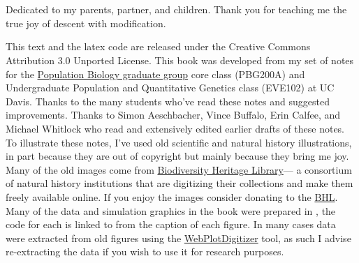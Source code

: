 \documentclass{tufte-book}
\begin{document}
\begin{fullwidth}
~\vfill
\thispagestyle{empty}

~\vfill
\begin{doublespace}
\noindent\fontsize{16}{18}\selectfont\itshape   %
\nohyphenation
\begin{center}
Dedicated to my parents, partner, and children. Thank you for teaching me the
true joy of descent with modification.
\end{center}
\end{doublespace}
\vfill
\vfill

\setlength{\parindent}{0pt}
\setlength{\parskip}{\baselineskip}
  \small This text and the latex code are released under the
  Creative Commons Attribution 3.0 Unported License. This book was developed from my set of notes for the \href{http://www-eve.ucdavis.edu/eve/pbg/}{Population
  Biology graduate group} core class (PBG200A) and Undergraduate Population and
  Quantitative Genetics class (EVE102) at UC Davis. Thanks to the many
  students who've read these notes and suggested improvements. Thanks
 to Simon Aeschbacher, Vince Buffalo, Erin Calfee, and Michael Whitlock who read
 and extensively edited earlier drafts of these notes. To illustrate these notes, I've used old scientific and natural history illustrations, in part
 because they are out of copyright but mainly because they bring me
 joy. Many of the old images come from
 \href{https://www.biodiversitylibrary.org/}{Biodiversity Heritage
   Library}--- a consortium of natural history institutions that are
 digitizing their collections and make them freely available
 online. If you enjoy the images consider donating to the
 \href{http://library.si.edu/donate-bhl}{BHL}. Many of the data and
 simulation graphics in the book were prepared in \citet{Rstats},
 the code for each is linked to from the caption of each figure. In many cases
 data were extracted from old figures using the
 \href{https://automeris.io/WebPlotDigitizer/}{WebPlotDigitizer}
 tool, as such I advise re-extracting the data if you wish to use it
 for research purposes.
\end{fullwidth}

\tableofcontents


\end{document}
